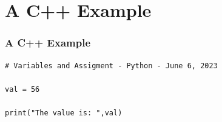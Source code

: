 \documentclass[fleqn]{beamer} %
\newcommand{\sectiontitleV}{A C++ Example }
\begin{document}
\section{\sectiontitleV}	
	\begin{frame}[label=sectionV,containsverbatim] \small
		\frametitle{\sectiontitleV}    
		
		\begin{lstlisting}
# Variables and Assigment - Python - June 6, 2023

val = 56 
	
print("The value is: ",val)
	
\end{lstlisting}

	\end{frame}
\end{document}
